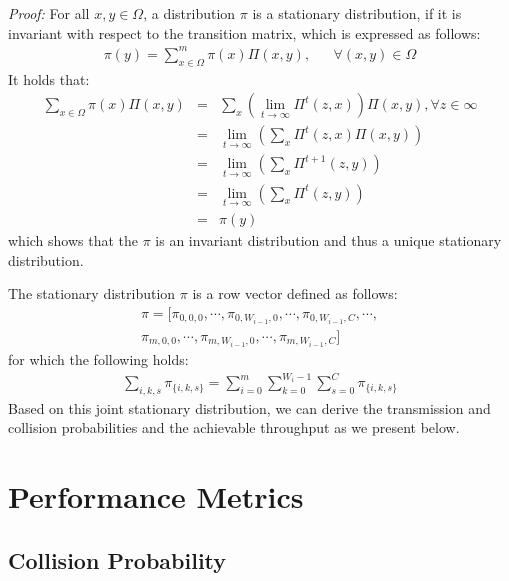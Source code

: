 \documentclass
[journal,11pt,draftclsnofoot,onecolumn,doublespace]{tETN2e}
\begin{document}
\textit{Proof:}  For all $x,y \in \Omega$, a distribution $\pi$ is a stationary distribution, if it is invariant with respect to the transition matrix, which is expressed as follows:
\begin{eqnarray} \label{eq9}
\pi(y) = \sum_{x \in \Omega}^m \pi(x) \Pi(x,y), & & \forall (x,y) \in \Omega
\end{eqnarray}
It holds that:
\begin{eqnarray} \label{eq10}
\sum_{x \in \Omega} \pi(x) \Pi(x,y) &=& \sum_{x} \left( \lim_{t\rightarrow \infty} \Pi^t(z,x) \right) \Pi(x,y),  \forall z \in \infty \nonumber \\
&=& \lim_{t \rightarrow \infty} \left( \sum_{x} \Pi^{t}(z,x) \Pi(x,y) \right) \nonumber \\
&=& \lim_{t \rightarrow \infty} \left( \sum_{x} \Pi^{t+1}(z,y)  \right)  \nonumber \\
&=& \lim_{t \rightarrow \infty} \left( \sum_{x} \Pi^{t}(z,y) \right) \nonumber \\
&=& \pi(y)
\end{eqnarray}
which shows that the $\pi$ is an invariant distribution and thus a unique stationary distribution. 

The stationary distribution $\pi$ is a row vector defined as follows: 
\begin{eqnarray} \label{eq11}
 \pi = [\pi_{0,0,0},\cdots,\pi_{0,W_{i-1},0},\cdots,\pi_{0,W_{i-1},C},\cdots, \nonumber \\
 \pi_{m,0,0},\cdots,\pi_{m,W_{i-1},0},\cdots,\pi_{m,W_{i-1},C}]
\end{eqnarray}
for which the following holds:
\begin{eqnarray} \label{eq12}
\sum_{i,k,s} \pi_{\lbrace i,k,s \rbrace} = \sum_{i=0}^m \sum_{k=0}^{W_i-1} \sum_{s=0}^C \pi_{\lbrace i,k,s \rbrace}
\end{eqnarray}
Based on this joint stationary distribution, we can derive the transmission and collision probabilities and the achievable throughput as we present below.

\section{Performance Metrics}

\subsection{Collision Probability}
\end{document}
